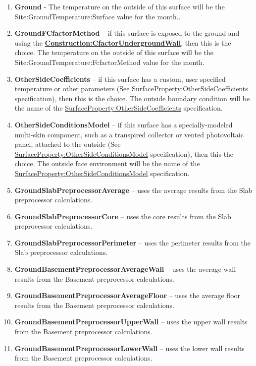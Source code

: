 \begin{enumerate}
  \item
    \textbf{Ground} - The temperature on the outside of this surface will be the Site:GroundTemperature:Surface value for the month..
  \item
    \textbf{GroundFCfactorMethod} -- if this surface is exposed to the ground and using the \textbf{\hyperref[constructioncfactorundergroundwall]{Construction:CfactorUndergroundWall}}, then this is the choice. The temperature on the outside of this surface will be the Site:GroundTemperature:FcfactorMethod value for the month.
  \item
    \textbf{OtherSideCoefficients} -- if this surface has a custom, user specified temperature or other parameters (See \hyperref[surfacepropertyothersidecoefficients]{SurfaceProperty:OtherSideCoefficients} specification), then this is the choice. The outside boundary condition will be the name of the \hyperref[surfacepropertyothersidecoefficients]{SurfaceProperty:OtherSideCoefficients} specification.
  \item
    \textbf{OtherSideConditionsModel} -- if this surface has a specially-modeled multi-skin component, such as a transpired collector or vented photovoltaic panel, attached to the outside (See \hyperref[surfacepropertyothersideconditionsmodel]{SurfaceProperty:OtherSideConditionsModel} specification), then this the choice. The outside face environment will be the name of the \hyperref[surfacepropertyothersideconditionsmodel]{SurfaceProperty:OtherSideConditionsModel} specification.
  \item
    \textbf{GroundSlabPreprocessorAverage} -- uses the average results from the Slab preprocessor calculations.
  \item
    \textbf{GroundSlabPreprocessorCore} -- uses the core results from the Slab preprocessor calculations.
  \item
    \textbf{GroundSlabPreprocessorPerimeter} -- uses the perimeter results from the Slab preprocessor calculations.
  \item
    \textbf{GroundBasementPreprocessorAverageWall} -- uses the average wall results from the Basement preprocessor calculations.
  \item
    \textbf{GroundBasementPreprocessorAverageFloor} -- uses the average floor results from the Basement preprocessor calculations.
  \item
    \textbf{GroundBasementPreprocessorUpperWall} -- uses the upper wall results from the Basement preprocessor calculations.
  \item
    \textbf{GroundBasementPreprocessorLowerWall} -- uses the lower wall results from the Basement preprocessor calculations.
\end{enumerate}

